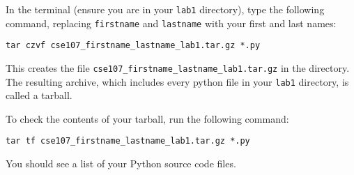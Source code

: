 \documentclass[12pt,hidelinks]{article}
\begin{document}
In the terminal (ensure you are in your \texttt{lab1} directory), type the following command, replacing \texttt{firstname} and \texttt{lastname} with your first and last names:

\begin{lstlisting}[style=bash]
tar czvf cse107_firstname_lastname_lab1.tar.gz *.py
\end{lstlisting}

This creates the file \texttt{cse107\_firstname\_lastname\_lab1.tar.gz} in the directory. The resulting archive, which includes every python file in your \texttt{lab1} directory, is called a tarball. 

To check the contents of your tarball, run the following command:

\begin{lstlisting}[style=bash]
tar tf cse107_firstname_lastname_lab1.tar.gz *.py
\end{lstlisting}

You should see a list of your Python source code files.


\pagebreak
\end{document}
